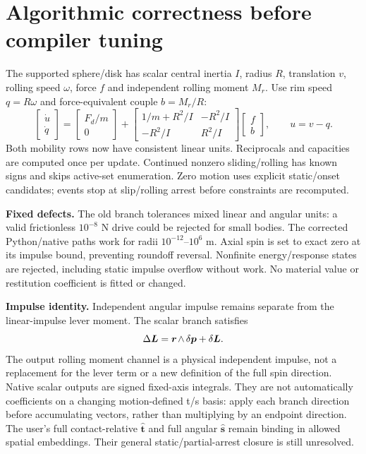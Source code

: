 \documentclass[10pt,a4paper]{article}
\begin{document}
\section*{Algorithmic correctness before compiler tuning}
The supported sphere/disk has scalar central inertia $I$, radius $R$, translation
$v$, rolling speed $\omega$, force $f$ and independent rolling moment $M_r$.
Use rim speed $q=R\omega$ and force-equivalent couple $b=M_r/R$:
\[
\begin{bmatrix}\dot u\\\dot q\end{bmatrix}=
\begin{bmatrix}F_d/m\\0\end{bmatrix}+
\begin{bmatrix}1/m+R^2/I&-R^2/I\\-R^2/I&R^2/I\end{bmatrix}
\begin{bmatrix}f\\b\end{bmatrix},\qquad u=v-q.
\]
Both mobility rows now have consistent linear units. Reciprocals and capacities
are computed once per update. Continued nonzero sliding/rolling has known signs
and skips active-set enumeration. Zero motion uses explicit static/onset candidates;
events stop at slip/rolling arrest before constraints are recomputed.

\textbf{Fixed defects.} The old branch tolerances mixed linear and angular units:
a valid frictionless $10^{-8}$ N drive could be rejected for small bodies. The
corrected Python/native paths work for radii $10^{-12}$--$10^6$ m. Axial spin is
set to exact zero at its impulse bound, preventing roundoff reversal. Nonfinite
energy/response states are rejected, including static impulse overflow without work.
No material value or restitution coefficient is fitted or changed.

\textbf{Impulse identity.} Independent angular impulse remains separate from the
linear-impulse lever moment. The scalar branch satisfies
\[
\Delta\boldsymbol L=\mathord{\boldsymbol r\mkern2mu\wedge}\,\delta\boldsymbol p+
\delta\boldsymbol L.
\]
The output rolling moment channel is a physical independent impulse, not a
replacement for the lever term or a new definition of the full spin direction.
Native scalar outputs are signed fixed-axis integrals. They are not automatically
coefficients on a changing motion-defined t/s basis: apply each branch direction
before accumulating vectors, rather than multiplying by an endpoint direction.
The user's full contact-relative $\hat{\boldsymbol t}$ and full angular
$\hat{\boldsymbol s}$ remain binding in allowed spatial embeddings. Their
general static/partial-arrest closure is still unresolved.
\end{document}

